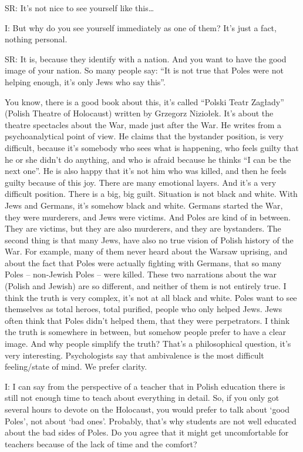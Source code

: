  

SR: It’s not nice to see yourself like this… 

 

I: But why do you see yourself immediately as one of them? It’s just a fact, nothing personal. 

 

SR: It is, because they identify with a nation. And you want to have the good image of your nation. So many people say: “It is not true that Poles were not helping enough, it’s only Jews who say this”. 

You know, there is a good book about this, it’s called “Polski Teatr Zagłady” (Polish Theatre of Holocaust) written by Grzegorz Niziołek. It’s about the theatre spectacles about the War, made just after the War. He writes from a psychoanalytical point of view. He claims that the bystander position, is very difficult, because it’s somebody who sees what is happening, who feels guilty that he or she didn’t do anything, and who is afraid because he thinks “I can be the next one”. He is also happy that it’s not him who was killed, and then he feels guilty because of this joy. There are many emotional layers. And it’s a very difficult position. There is a big, big guilt. Situation is not black and white. With Jews and Germans, it’s somehow black and white. Germans started the War, they were murderers, and Jews were victims. And Poles are kind of in between. They are victims, but they are also murderers, and they are bystanders. The second thing is that many Jews, have also no true vision of Polish history of the War. For example, many of them never heard about the Warsaw uprising, and about the fact that Poles were actually fighting with Germans, that so many Poles – non-Jewish Poles – were killed. These two narrations about the war (Polish and Jewish) are so different, and neither of them is not entirely true. I think the truth is very complex, it’s not at all black and white. Poles want to see themselves as total heroes, total purified, people who only helped Jews. Jews often think that Poles didn’t helped them, that they were perpetrators. I think the truth is somewhere in between, but somehow people prefer to have a clear image. And why people simplify the truth? That’s a philosophical question, it’s very interesting. Psychologists say that ambivalence is the most difficult feeling/state of mind. We prefer clarity. 

 

I: I can say from the perspective of a teacher that in Polish education there is still not enough time to teach about everything in detail. So, if you only got several hours to devote on the Holocaust, you would prefer to talk about ‘good Poles’, not about ‘bad ones’. Probably, that’s why students are not well educated about the bad sides of Poles. Do you agree that it might get uncomfortable for teachers because of the lack of time and the comfort? 

